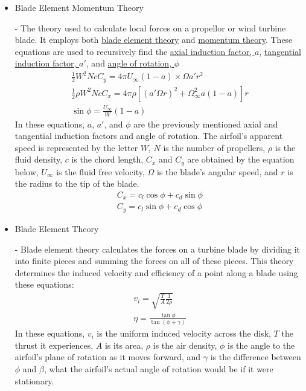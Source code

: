 \documentclass{article}
\begin{document}
\begin{itemize}
	\item \hypertarget{BEM}{Blade Element Momentum Theory} - The theory used to calculate local forces on a propellor or wind turbine blade. It employs both \hyperlink{BET}{blade element theory} and \hyperlink{MT}{momentum theory}. These equations are used to recursively find the \hyperlink{a}{axial induction factor, $a$}, \hyperlink{a'}{tangential induction factor, $a'$}, and \hyperlink{phi}{angle of rotation, $\phi$}
	\begin{equation}
	\begin{aligned}
		\frac{1}{2} W^{2} N c C_{y} = 4 \pi U_{\infty} (1 - a) \times \Omega a' r^{2} \\
		\frac{1}{2} \rho W^{2} N c C_{x} = 4 \pi \rho [(a' \Omega r)^{2} + \Omega^{2}_{\infty} a (1 - a)] r \\
		\sin \phi = \frac{U_{\infty}}{W} (1 - a)
	\end{aligned}
	\end{equation}
In these equations, $a$, $a'$, and $\phi$ are the previously mentioned axial and tangential induction factors and angle of rotation. The airfoil's apparent speed is represented by the letter $W$, $N$ is the number of propellers, $\rho$ is the fluid density, $c$ is the chord length, $C_{x}$ and $C_{y}$ are obtained by the equation below, $U_{\infty}$ is the fluid free velocity, $\Omega$ is the blade's angular speed, and $r$ is the radius to the tip of the blade.
	\begin{equation}
	\begin{aligned}
		C_{x} = c_{l} \cos{\phi} + c_{d} \sin{\phi} \\
		C_{y} = c_{l} \sin{\phi} + c_{d} \cos{\phi}
	\end{aligned}
	\end{equation}
	
	\item \hypertarget{BET}{Blade Element Theory} - Blade element theory calculates the forces on a turbine blade by dividing it into finite pieces and summing the forces on all of these pieces. This theory determines the induced velocity and efficiency of a point along a blade using these equations:
	\begin{equation}
	\begin{aligned}
		v_{i} = \sqrt{\frac{T}{A} \frac{1}{2 \rho}} \\
        		\eta = \frac{\tan{\phi}}{\tan{(\phi + \gamma)}}
	\end{aligned}
	\end{equation}
In these equations, $v_{i}$ is the uniform induced velocity across the disk, $T$ the thrust it experiences, $A$ is its area, $\rho$ is the air density, $\phi$ is the angle to the airfoil's plane of rotation as it moves forward, and $\gamma$ is the difference between $\phi$ and $\beta$, what the airfoil's actual angle of rotation would be if it were stationary.


\end{itemize}
\end{document}
